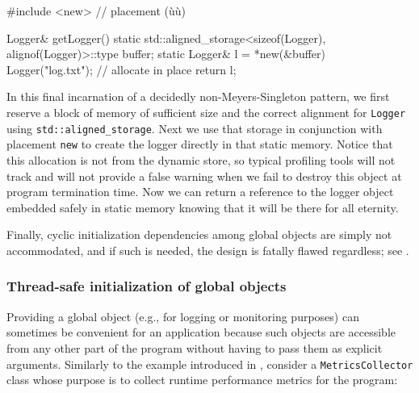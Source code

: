 \begin{emcppslisting}[emcppsbatch=e13]
#include <new>  // placement (ù{}ù)

Logger& getLogger()
{
    static std::aligned_storage<sizeof(Logger), alignof(Logger)>::type buffer;
    static Logger& l = *new(&buffer) Logger("log.txt");  // allocate in place
    return l;
}
\end{emcppslisting}

\noindent In this final incarnation of a decidedly non-Meyers-Singleton pattern,
we first reserve a block of memory of sufficient size and the correct
alignment for \lstinline!Logger! using \linebreak[4]%
\lstinline!std::aligned_storage!. Next
we use that storage in conjunction with placement \lstinline!new! to create
the logger directly in that static memory. Notice that this allocation
is not from the dynamic store, so typical profiling tools will not track
and will not provide a false warning when we fail to destroy this object
at program termination time. Now we can return a reference to the logger
object embedded safely in static memory knowing that it will be there
for all eternity.

Finally, cyclic initialization dependencies among global objects are
simply not accommodated, and if such is needed, the design is fatally
flawed regardless; see .

\subsubsection[Thread-safe initialization of global objects]{Thread-safe initialization of global objects}\label{thread-safe-initialization-of-global-objects}

Providing a global object (e.g., for logging or monitoring purposes) can
sometimes be convenient for an application because such objects are
accessible from any other part of the program without having to pass
them as explicit arguments. Similarly to the example introduced in , consider a
\lstinline!MetricsCollector! class whose purpose is to collect runtime
performance metrics for the program:

